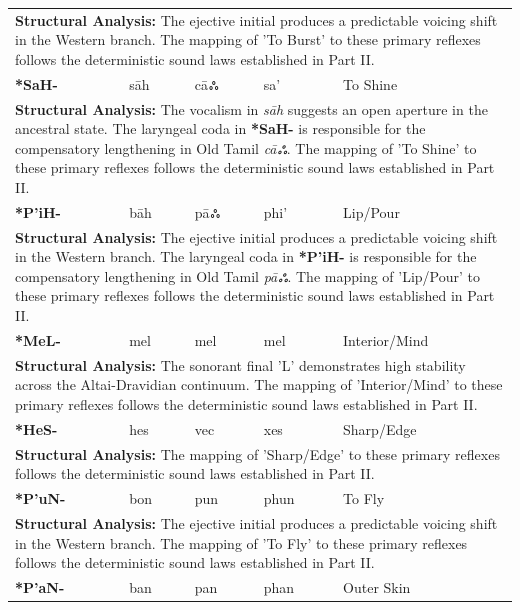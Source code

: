 \begin{longtable}{p{} p{} p{} p{} p{}}
\multicolumn{5}{p{\textwidth}}{\small \textbf{Structural Analysis:} The ejective initial produces a predictable voicing shift in the Western branch. The mapping of 'To Burst' to these primary reflexes follows the deterministic sound laws established in Part II.} \\ \addlinespace[15pt] 
\textbf{*SaH-} & sāh & cāஃ & sa' & To Shine \\ 
\multicolumn{5}{p{\textwidth}}{\small \textbf{Structural Analysis:} The vocalism in \textit{sāh} suggests an open aperture in the ancestral state. The laryngeal coda in \textbf{*SaH-} is responsible for the compensatory lengthening in Old Tamil \textit{cāஃ}. The mapping of 'To Shine' to these primary reflexes follows the deterministic sound laws established in Part II.} \\ \addlinespace[15pt] 
\textbf{*P'iH-} & bāh & pāஃ & phi' & Lip/Pour \\ 
\multicolumn{5}{p{\textwidth}}{\small \textbf{Structural Analysis:} The ejective initial produces a predictable voicing shift in the Western branch. The laryngeal coda in \textbf{*P'iH-} is responsible for the compensatory lengthening in Old Tamil \textit{pāஃ}. The mapping of 'Lip/Pour' to these primary reflexes follows the deterministic sound laws established in Part II.} \\ \addlinespace[15pt] 
\textbf{*MeL-} & mel & mel & mel & Interior/Mind \\ 
\multicolumn{5}{p{\textwidth}}{\small \textbf{Structural Analysis:} The sonorant final 'L' demonstrates high stability across the Altai-Dravidian continuum. The mapping of 'Interior/Mind' to these primary reflexes follows the deterministic sound laws established in Part II.} \\ \addlinespace[15pt] 
\textbf{*HeS-} & hes & vec & xes & Sharp/Edge \\ 
\multicolumn{5}{p{\textwidth}}{\small \textbf{Structural Analysis:}  The mapping of 'Sharp/Edge' to these primary reflexes follows the deterministic sound laws established in Part II.} \\ \addlinespace[15pt] 
\textbf{*P'uN-} & bon & pun & phun & To Fly \\ 
\multicolumn{5}{p{\textwidth}}{\small \textbf{Structural Analysis:} The ejective initial produces a predictable voicing shift in the Western branch. The mapping of 'To Fly' to these primary reflexes follows the deterministic sound laws established in Part II.} \\ \addlinespace[15pt] 
\textbf{*P'aN-} & ban & pan & phan & Outer Skin \\ 

\end{longtable}
